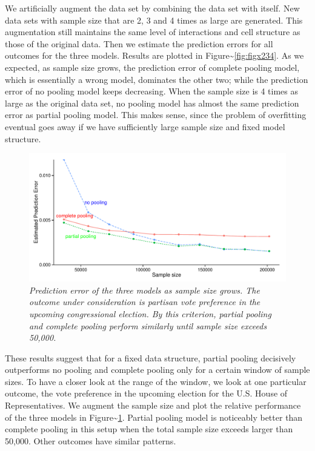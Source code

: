 \documentclass[11pt,article,oneside]{memoir}
\begin{document}
We artificially augment the data set by combining the data set with
itself. New data sets with sample size that are 2, 3 and 4 times as
large are generated. This augmentation still maintains the same level of
interactions and cell structure as those of the original data. Then we
estimate the prediction errors for all outcomes for the three models.
Results are plotted in Figure\textasciitilde{}\ref{fig:figx234}. As we
expected, as sample size grows, the prediction error of complete pooling
model, which is essentially a wrong model, dominates the other two;
while the prediction error of no pooling model keeps decreasing. When
the sample size is 4 times as large as the original data set, no pooling
model has almost the same prediction error as partial pooling model.
This makes sense, since the problem of overfitting eventual goes away if
we have sufficiently large sample size and fixed model structure.

\begin{figure}
  \centering
  \includegraphics[width=.85\textwidth]{hourvote.pdf}
  \caption{\em Prediction error of the three models as sample size grows. The
    outcome under consideration is partisan vote preference in the upcoming
    congressional election. By this criterion, partial pooling and complete
    pooling perform similarly until sample size exceeds 50,000.}
  \label{fig:hourvote}
\end{figure}

These results suggest that for a fixed data structure, partial pooling
decisively outperforms no pooling and complete pooling only for a
certain window of sample sizes. To have a closer look at the range of
the window, we look at one particular outcome, the vote preference in
the upcoming election for the U.S. House of Representatives. We augment
the sample size and plot the relative performance of the three models in
Figure\textasciitilde{}\ref{fig:hourvote}. Partial pooling model is
noticeably better than complete pooling in this setup when the total
sample size exceeds larger than 50,000. Other outcomes have similar
patterns.
\end{document}
